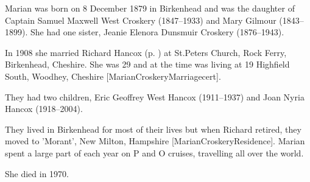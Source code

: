 
Marian was born on 8 December 1879 in  Birkenhead and was the daughter of   Captain Samuel Maxwell West Croskery (1847--1933) and Mary Gilmour (1843--1899). She had one sister, Jeanie Elenora Dunsmuir Croskery (1876--1943).

In 1908 she married Richard Hancox (p. \pageref{Richard_James_Hancox}) at St.Peters Church, Rock Ferry, Birkenhead, Cheshire. She was 29 and at the time was living at 19 Highfield South, Woodhey, Cheshire [MarianCroskeryMarriagecert].

They had two children, Eric Geoffrey West Hancox (1911--1937) and Joan Nyria Hancox (1918--2004).

They lived in Birkenhead for most of their lives but when Richard retired, they moved to  'Morant', New Milton, Hampshire [MarianCroskeryResidence].  Marian spent a large part of each year on P and O cruises, travelling all over the world.

She died in 1970.
